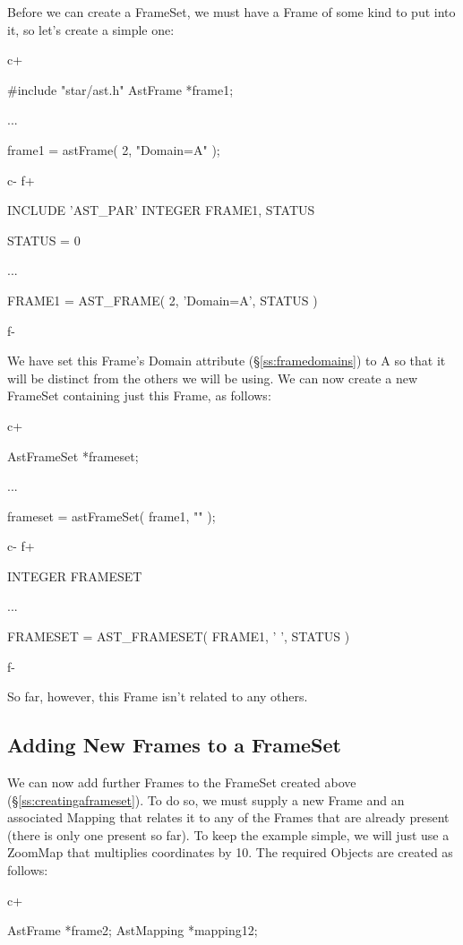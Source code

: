 \documentclass[twoside,11pt]{starlink}
\providecommand{\secref}[1]{\S\ref{#1}}
\begin{document}
{Before we can create a FrameSet, we must have a Frame of some kind to
put into it, so let's create a simple one:

c+
\small
\begin{terminalv}
#include "star/ast.h"
AstFrame *frame1;

...

frame1 = astFrame( 2, "Domain=A" );
\end{terminalv}
\normalsize
c-
f+
\small
\begin{terminalv}
      INCLUDE 'AST_PAR'
      INTEGER FRAME1, STATUS

      STATUS = 0

      ...

      FRAME1 = AST_FRAME( 2, 'Domain=A', STATUS )
\end{terminalv}
\normalsize
f-

We have set this Frame's Domain attribute (\secref{ss:framedomains}) to
A so that it will be distinct from the others we will be using. We can
now create a new FrameSet containing just this Frame, as follows:

c+
\small
\begin{terminalv}
AstFrameSet *frameset;

...

frameset = astFrameSet( frame1, "" );
\end{terminalv}
\normalsize
c-
f+
\small
\begin{terminalv}
      INTEGER FRAMESET

      ...

      FRAMESET = AST_FRAMESET( FRAME1, ' ', STATUS )
\end{terminalv}
\normalsize
f-

So far, however, this Frame isn't related to any others.

\subsection{\label{ss:addingframes}Adding New Frames to a FrameSet}

We can now add further Frames to the FrameSet created above
(\secref{ss:creatingaframeset}). To do so, we must supply a new Frame
and an associated Mapping that relates it to any of the Frames that
are already present (there is only one present so far).  To keep the
example simple, we will just use a ZoomMap that multiplies coordinates
by 10. The required Objects are created as follows:

c+
\small
\begin{terminalv}
AstFrame *frame2;
AstMapping *mapping12;


\end{terminalv}}
\end{document}
